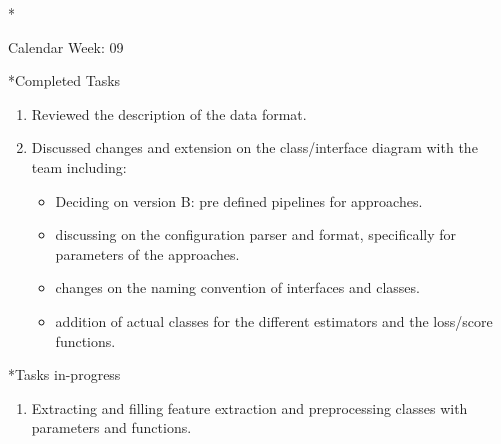 \documentclass[11pt,a4paper]{article}
\begin{document}
\newpage
\begin{section}*{Calendar Week: 09 \hfill \date{05 March, 2021}}
	
	\begin{subsection}*{Completed Tasks}
		\begin{enumerate}
			\item Reviewed the description of the data format.
			\item Discussed changes and extension on the class/interface diagram with the team including:
			\begin{itemize}
				\item Deciding on version B: pre defined pipelines for approaches.
				\item discussing on the configuration parser and format, specifically for parameters of the approaches.
				\item changes on the naming convention of interfaces and classes.
				\item addition of actual classes for the different estimators and the loss/score functions. 
			\end{itemize}
		\end{enumerate}
	\end{subsection}
	
	\begin{subsection}*{Tasks in-progress}
		\begin{enumerate}
			\item Extracting and filling feature extraction and preprocessing classes with parameters and functions.
		\end{enumerate}
	\end{subsection}
	
\end{section}
\end{document}
